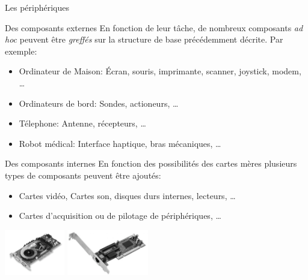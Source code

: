 \begin{frame}{Les périphériques}
  \begin{block}{Des composants externes}
    En fonction de leur tâche, de nombreux composants \textit{ad hoc}
    peuvent être \textit{greffés} sur la structure de base précédemment
    décrite. Par exemple:
    \begin{itemize}
    \item Ordinateur de Maison: Écran, souris, imprimante, scanner,
      joystick, modem, \dots
    \item Ordinateurs de bord: Sondes, actioneurs, \dots
    \item Télephone: Antenne, récepteurs, \dots
    \item Robot médical: Interface haptique, bras mécaniques, \dots
    \end{itemize}
  \end{block}
  \begin{block}{Des composants internes}
    En fonction des possibilités des cartes mères plusieurs types de
    composants peuvent être ajoutés:
    \begin{itemize}
    \item Cartes vidéo, Cartes son, disques durs internes, lecteurs,
      \dots
    \item Cartes d'acquisition ou de pilotage de périphériques, \dots
    \end{itemize}
  \end{block}
  \begin{center}
    \includegraphics[height=2cm]{img/s01/carte_video.png}
    \hspace{2cm}
    \includegraphics[height=2cm]{img/s01/carte_reseau.png}
  \end{center}
\end{frame}

